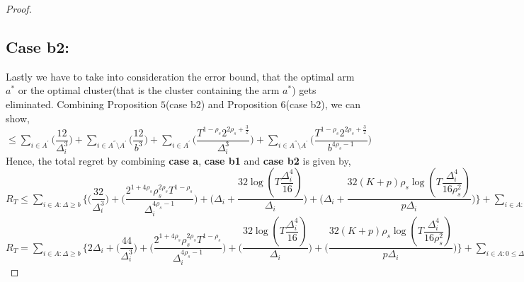 \begin{proof}
\subsection{Case b2:} 
Lastly we have to take into consideration the error bound, that the optimal arm $a^{*}$ or the optimal cluster(that is the cluster containing the arm $a^{*}$) gets eliminated. Combining Proposition $5$(case b2) and Proposition $6$(case b2), we can show,
\newline
$\leq\sum_{i\in A^{'}}\bigg(\dfrac{12}{\Delta_{i}^{3}} \bigg)+\sum_{i\in A^{''}\setminus A^{'}}\bigg(\dfrac{12}{b^{3}} \bigg) + \sum_{i\in A^{'}}\bigg(\dfrac{T^{1-\rho_{s}}2^{2\rho_{s}+\frac{3}{2}}}{\Delta_{i}^{3}} \bigg)+\sum_{i\in A^{''}\setminus A^{'}}\bigg(\dfrac{T^{1-\rho_{s}}2^{2\rho_{s}+\frac{3}{2}}}{b^{4\rho_{s} -1}} \bigg)$
\newline
Hence, the total regret by combining \textbf{case a}, \textbf{case b1} and \textbf{case b2} is given by,
\newline
$R_{T}\leq \sum_{i\in A:\Delta\geq b} \bigg\lbrace \bigg(\dfrac{32}{\Delta_{i}^{3}}\bigg) + \bigg(\dfrac{2^{1+4\rho_{s}}\rho_{s}^{2\rho_{s}}T^{1-\rho_{s}}}{\Delta_{i}^{4\rho_{s}-1}}\bigg) + \bigg(\Delta_{i}+\dfrac{32\log{(T\dfrac{\Delta_{i}^{4}}{16})}}{\Delta_{i}}\bigg) + \bigg(\Delta_{i}+\dfrac{32(K+p)\rho_{s}\log{(T\dfrac{\Delta_{i}^{4}}{16\rho_{s}^{2}})}}{p\Delta_{i}}\bigg)\bigg\rbrace + \sum_{i\in A:0\leq\Delta_{i}\leq b}\bigg\lbrace \bigg(\dfrac{12}{\Delta_{i}^{3}} \bigg) + \bigg(\dfrac{12}{b^{3}} \bigg) + \bigg(\dfrac{T^{1-\rho_{s}}2^{2\rho_{s}+\frac{3}{2}}}{\Delta_{i}^{3}} \bigg)+\bigg(\dfrac{T^{1-\rho_{s}}2^{2\rho_{s}+\frac{3}{2}}}{b^{4\rho_{s} -1}} \bigg) \bigg\rbrace + max_{i:\Delta\leq b}\Delta_{i}T $
\newline
$R_{T}= \sum_{i\in A:\Delta\geq b} \bigg\lbrace 2\Delta_{i}+ \bigg(\dfrac{44}{\Delta_{i}^{3}}\bigg) + \bigg(\dfrac{2^{1+4\rho_{s}}\rho_{s}^{2\rho_{s}}T^{1-\rho_{s}}}{\Delta_{i}^{4\rho_{s}-1}}\bigg) + \bigg(\dfrac{32\log{(T\dfrac{\Delta_{i}^{4}}{16})}}{\Delta_{i}}\bigg) + \bigg(\dfrac{32(K+p)\rho_{s}\log{(T\dfrac{\Delta_{i}^{4}}{16\rho_{s}^{2}})}}{p\Delta_{i}}\bigg)\bigg\rbrace + \sum_{i\in A:0\leq\Delta_{i}\leq b}\bigg\lbrace \bigg(\dfrac{12}{b^{3}} \bigg) + \bigg(\dfrac{T^{1-\rho_{s}}2^{2\rho_{s}+\frac{3}{2}}}{\Delta_{i}^{3}} \bigg)+\bigg(\dfrac{T^{1-\rho_{s}}2^{2\rho_{s}+\frac{3}{2}}}{b^{4\rho_{s} -1}} \bigg) \bigg\rbrace + max_{i:\Delta\leq b}\Delta_{i}T $

\end{proof}
